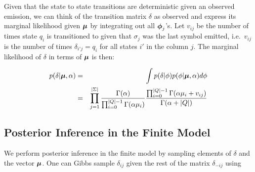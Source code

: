  
 
 Given that the state to state transitions are deterministic given an observed emission, we can think of the transition matrix $\delta$ as observed and express its marginal likelihood given $\bmu$ by integrating out all $\bphi_j$'s.  Let $v_{ij}$ be the number of times state $q_i$ is transitioned to given that $\sigma_j$ was the last symbol emitted, i.e.~$v_{ij}$ is the number of times $\delta_{i'j} = q_i$ for all states $i'$ in the column $j$. %
The marginal likelihood of $\delta$ in terms of $\bmu$ is then:
 
 \begin{eqnarray}
 p(\delta|\bmu,\alpha) & = & \int p(\delta|\phi)p(\phi|\bmu,\alpha) d\phi \label{delta:factor}\\
  & = &  \prod_{j=1}^{|\Sigma|} \frac{\Gamma(\alpha)}{\prod_{i=0}^{|Q|-1}\Gamma(\alpha\mu_i)} \frac{\prod_{i=0}^{|Q|-1} \Gamma(\alpha\mu_i + v_{ij})}{\Gamma(\alpha + |Q|)} \label{delta:end}
  \end{eqnarray}



 
 \subsection{Posterior Inference in the Finite Model}
 
We perform posterior inference in the finite model by sampling elements of $\delta$ and the vector $\bmu$.  %
One can Gibbs sample $\delta_{ij}$ given the rest of the matrix $\delta_{-ij}$ using 

